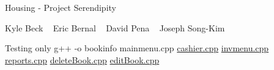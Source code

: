 Housing -\/ Project Serendipity

Kyle Beck ~\newline
 Eric Bernal ~\newline
 David Pena ~\newline
 Joseph Song-\/\+Kim ~\newline


Testing only g++ -\/o bookinfo mainmenu.\+cpp \mbox{\hyperlink{cashier_8cpp}{cashier.\+cpp}} \mbox{\hyperlink{invmenu_8cpp}{invmenu.\+cpp}} \mbox{\hyperlink{reports_8cpp}{reports.\+cpp}} \mbox{\hyperlink{deleteBook_8cpp}{delete\+Book.\+cpp}} \mbox{\hyperlink{editBook_8cpp}{edit\+Book.\+cpp}} 